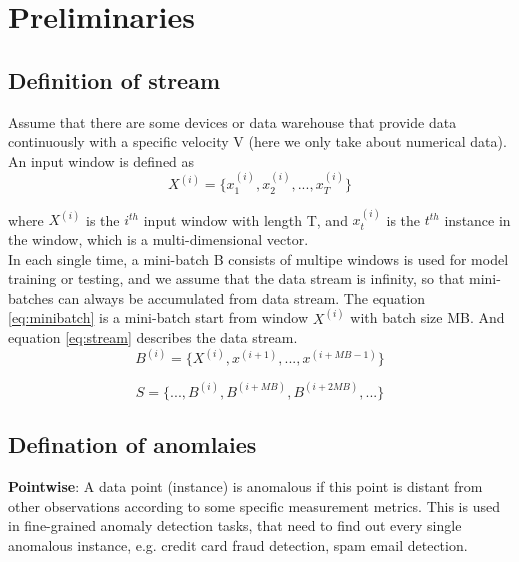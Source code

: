 \chapter{Preliminaries}
\label{Preliminaries}

\section{Definition of stream}
\label{sec:Definition of stream}

Assume that there are some devices or data warehouse that provide data continuously with a specific velocity V (here we only take about numerical data). An input window is defined as
\begin{equation} \label{eq:timeseries}
X^{(i)}=\{x_1^{(i)},x_2^{(i)}, ... , x_T^{(i)}\}
\end{equation}
	                        
	
where \textbf{$X^{(i)}$} is the \textbf{$i^{th}$} input window with length T, and \textbf{$x_t^{(i)}$} is the \textbf{$t^{th}$} instance in the window, which is a multi-dimensional vector.\\

In each single time, a mini-batch B consists of multipe windows is used for model training or testing, and we assume that the data stream is infinity, so that mini-batches can always be accumulated from data stream. The equation \ref{eq:minibatch} is a mini-batch start from window \textbf{$X^{(i)}$} with batch size MB. And equation \ref{eq:stream} describes the data stream.
\begin{equation} \label{eq:minibatch}
B^{(i)}=\{X^{(i)},x^{(i+1)}, ... , x^{(i+MB-1)}\}
\end{equation}

\begin{equation} \label{eq:stream}
S=\{..., B^{(i)},B^{(i+MB)}, B^{(i+2MB)},...\}
\end{equation}



\section{Defination of anomlaies}
\label{sec:Defination of anomalies}

\textbf{Pointwise}: A data point (instance) is anomalous if this point is distant from other observations according to some specific measurement metrics. This is used in fine-grained anomaly detection tasks, that need to find out every single anomalous instance, e.g. credit card fraud detection, spam email detection.\\

